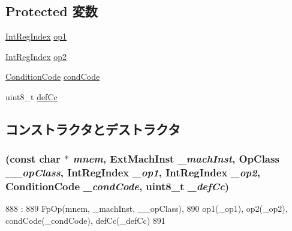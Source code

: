 \subsection*{Protected 変数}
\begin{DoxyCompactItemize}
\item 
\hyperlink{namespaceArmISA_ae64680ba9fb526106829d6bf92fc791b}{IntRegIndex} \hyperlink{classArmISA_1_1FpCondCompRegOp_a4c465c43ad568f8bcf8ae71480e9cfea}{op1}
\item 
\hyperlink{namespaceArmISA_ae64680ba9fb526106829d6bf92fc791b}{IntRegIndex} \hyperlink{classArmISA_1_1FpCondCompRegOp_a7799ff6cbe5a252199059eb8665820e7}{op2}
\item 
\hyperlink{namespaceArmISA_ab8f08e777c4753720cff841f81da8e06}{ConditionCode} \hyperlink{classArmISA_1_1FpCondCompRegOp_a273dc0fe84de8f4a9cf52aaf8dc27885}{condCode}
\item 
uint8\_\-t \hyperlink{classArmISA_1_1FpCondCompRegOp_a67b4730d4f641c62c31e1b7724f93433}{defCc}
\end{DoxyCompactItemize}


\subsection{コンストラクタとデストラクタ}
\hypertarget{classArmISA_1_1FpCondCompRegOp_a635739279a75a3639f11c77721eb0a0b}{
\subsubsection[{FpCondCompRegOp}]{ (const char $\ast$ {\em mnem}, \/  {\bf ExtMachInst} {\em \_\-machInst}, \/  OpClass {\em \_\-\_\-opClass}, \/  {\bf IntRegIndex} {\em \_\-op1}, \/  {\bf IntRegIndex} {\em \_\-op2}, \/  {\bf ConditionCode} {\em \_\-condCode}, \/  uint8\_\-t {\em \_\-defCc})}}
\label{classArmISA_1_1FpCondCompRegOp_a635739279a75a3639f11c77721eb0a0b}



\begin{DoxyCode}
888                                                                 :
889         FpOp(mnem, _machInst, __opClass),
890         op1(_op1), op2(_op2), condCode(_condCode), defCc(_defCc)
891     {}

\end{DoxyCode}


